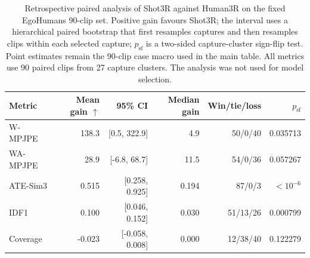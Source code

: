 \begin{table}[t]
  \centering
  \small
  \caption{Retrospective paired analysis of Shot3R against Human3R
  on the fixed EgoHumans 90-clip set. Positive gain favours Shot3R; the
  interval uses a hierarchical paired bootstrap that first resamples captures
  and then resamples clips within each selected capture; $p_{\mathrm{sf}}$ is a
  two-sided capture-cluster sign-flip test. Point estimates remain the 90-clip
  case macro used in the main table. All metrics use 90 paired clips from 27
  capture clusters. The analysis was not used for model selection.}
  \label{tab:egohumans-strict-paired}
  \begin{tabular}{lrrrrr}
    \toprule
    Metric & Mean gain $\uparrow$ & 95\% CI & Median gain & Win/tie/loss & $p_{\mathrm{sf}}$ \\
    \midrule
    W-MPJPE & 138.3 & [0.5, 322.9] & 4.9 & 50/0/40 & 0.035713 \\
    WA-MPJPE & 28.9 & [-6.8, 68.7] & 11.5 & 54/0/36 & 0.057267 \\
    ATE-Sim3 & 0.515 & [0.258, 0.925] & 0.194 & 87/0/3 & $<10^{-6}$ \\
    IDF1 & 0.100 & [0.046, 0.152] & 0.030 & 51/13/26 & 0.000799 \\
    Coverage & -0.023 & [-0.058, 0.008] & 0.000 & 12/38/40 & 0.122279 \\
    \bottomrule
  \end{tabular}
\end{table}
